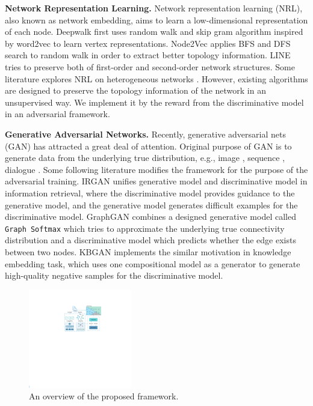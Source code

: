 \documentclass[letterpaper]{article} %
\begin{document}
\noindent \textbf{Network Representation Learning.}
Network representation learning (NRL), also known as network embedding, aims to learn a low-dimensional representation of each node.
Deepwalk \cite{DeepWalk} first uses random walk and skip gram algorithm inspired by word2vec \cite{word2vec1,wor2vec2} to learn vertex representations.
Node2Vec \cite{Node2vec} applies BFS and DFS search to random walk in order to extract better topology information.
LINE \cite{LINE} tries to preserve both of first-order and second-order network structures.
Some literature explores NRL on heterogeneous networks \cite{PTE,Metapath2Vec}.
However, existing algorithms are designed to preserve the topology information of the network in an unsupervised way.
We implement it by the reward from the discriminative model in an adversarial framework.

\noindent \textbf{Generative Adversarial Networks.}
Recently, generative adversarial nets (GAN) \cite{GAN} has attracted a great deal of attention. Original purpose of GAN is to generate data from the underlying true distribution, e.g., image \cite{image}, sequence \cite{seq}, dialogue \cite{Dialogue}. Some following literature modifies the framework for the purpose of the adversarial training.
IRGAN \cite{IRGAN} unifies generative model and discriminative model in information retrieval, where the discriminative model provides guidance to the generative model,
and the generative model generates difficult examples for the discriminative model.
GraphGAN \cite{GraphGAN} combines a designed generative model called \texttt{Graph Softmax} which tries to approximate the
underlying true connectivity distribution and a discriminative model which predicts whether the edge exists between two nodes.
KBGAN \cite{KBGAN} implements the similar motivation in knowledge embedding task, which uses one compositional model as a generator to generate high-quality negative samples for the discriminative model.

\begin{figure}[t]
\centering
\includegraphics[width=0.4\textwidth]{framework.pdf}
\caption{An overview of the proposed framework.}
\label{fig:framework}
\end{figure}
\end{document}
